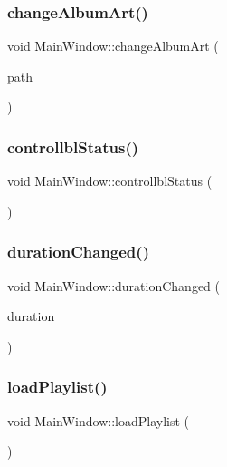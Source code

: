 \subsubsection{\texorpdfstring{changeAlbumArt()}{changeAlbumArt()}}
{\footnotesize\ttfamily void Main\+Window\+::change\+Album\+Art (\begin{DoxyParamCaption}\item[{Q\+String}]{path }\end{DoxyParamCaption})}

\mbox{\label{class_main_window_afd4837508fd24b55c9a72a2bd2c20ea9}} 
\subsubsection{\texorpdfstring{controllblStatus()}{controllblStatus()}}
{\footnotesize\ttfamily void Main\+Window\+::controllbl\+Status (\begin{DoxyParamCaption}{ }\end{DoxyParamCaption})}

\mbox{\label{class_main_window_abbf9b15e3b76bd06f13c0198e7ed486b}} 
\subsubsection{\texorpdfstring{durationChanged()}{durationChanged()}}
{\footnotesize\ttfamily void Main\+Window\+::duration\+Changed (\begin{DoxyParamCaption}\item[{qint64}]{duration }\end{DoxyParamCaption})}

\mbox{\label{class_main_window_ac877ae03abf6415808e0bb36ff71e5be}} 
\subsubsection{\texorpdfstring{loadPlaylist()}{loadPlaylist()}}
{\footnotesize\ttfamily void Main\+Window\+::load\+Playlist (\begin{DoxyParamCaption}{ }\end{DoxyParamCaption})}

